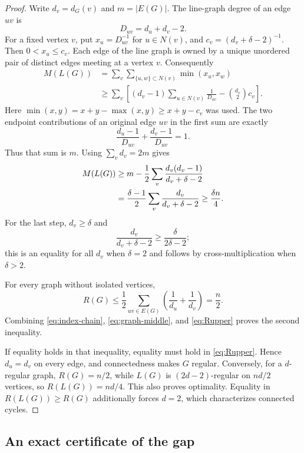 \documentclass[11pt]{article}
\theoremstyle{remark}\newtheorem{remark}[theorem]{Remark}
\begin{document}
\begin{proof}
Write $d_v=d_G(v)$ and $m=|E(G)|$. The line-graph degree of an edge $uv$ is
\[
 D_{uv}=d_u+d_v-2.
\]
For a fixed vertex $v$, put $x_u=D_{uv}^{-1}$ for $u\in N(v)$, and
$c_v=(d_v+\delta-2)^{-1}$. Then $0<x_u\le c_v$.
Each edge of the line graph is owned by a unique unordered pair of
distinct edges meeting at a vertex $v$. Consequently
\begin{align*}
 M(L(G))
 &=\sum_v\sum_{\{u,w\}\subset N(v)}\min(x_u,x_w)\\
 &\ge\sum_v\left[(d_v-1)\sum_{u\in N(v)}\frac1{D_{uv}}
             -\binom{d_v}{2}c_v\right].
\end{align*}
Here $\min(x,y)=x+y-\max(x,y)\ge x+y-c_v$ was used.
The two endpoint contributions of an original edge $uv$ in the first
sum are exactly
\[
 \frac{d_u-1}{D_{uv}}+\frac{d_v-1}{D_{uv}}=1.
\]
Thus that sum is $m$. Using $\sum_vd_v=2m$ gives
\begin{align}
 M(L(G))
 &\ge m-\frac12\sum_v\frac{d_v(d_v-1)}{d_v+\delta-2}\notag\\
 &=\frac{\delta-1}{2}\sum_v\frac{d_v}{d_v+\delta-2}
 \ge\frac{\delta n}{4}.\label{eq:graph-middle}
\end{align}
For the last step, $d_v\ge\delta$ and
\[
 \frac{d_v}{d_v+\delta-2}\ge\frac{\delta}{2\delta-2};
\]
this is an equality for all $d_v$ when $\delta=2$ and follows by
cross-multiplication when $\delta>2$.

For every graph without isolated vertices,
\begin{equation}\label{eq:Rupper}
 R(G)\le\frac12\sum_{uv\in E(G)}\left(\frac1{d_u}+\frac1{d_v}\right)
 =\frac n2.
\end{equation}
Combining \eqref{eq:index-chain}, \eqref{eq:graph-middle}, and
\eqref{eq:Rupper} proves the second inequality.

If equality holds in that inequality, equality must hold in
\eqref{eq:Rupper}. Hence $d_u=d_v$ on every edge, and connectedness makes
$G$ regular. Conversely, for a $d$-regular graph, $R(G)=n/2$, while
$L(G)$ is $(2d-2)$-regular on $nd/2$ vertices, so $R(L(G))=nd/4$.
This also proves optimality. Equality in $R(L(G))\ge R(G)$ additionally
forces $d=2$, which characterizes connected cycles.
\end{proof}

\subsection{An exact certificate of the gap}
\end{document}
